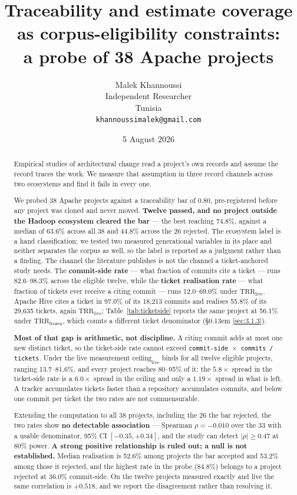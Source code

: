 \documentclass[11pt,a4paper]{article}
\title{\bfseries Traceability and estimate coverage as corpus-eligibility
constraints:\\[2pt] a probe of 38 Apache projects}
\author{Malek Khannoussi\\[2pt]
\normalsize Independent Researcher\\
\normalsize Tunisia\\
\normalsize\texttt{khannoussimalek@gmail.com}}
\date{5 August 2026}
\begin{document}
\maketitle
\thispagestyle{empty}


\begin{abstract}

Empirical studies of architectural change read a project's own records and assume the record traces the work. We measure that assumption in three record channels across two ecosystems and find it fails in every one.

We probed 38 Apache projects against a traceability bar of 0.80, pre-registered before any project was cloned and never moved. \textbf{Twelve passed, and no project outside the Hadoop ecosystem cleared the bar} --- the best reaching 74.8\%, against a median of 63.6\% across all 38 and 44.8\% across the 26 rejected. The ecosystem label is a hand classification; we tested two measured generational variables in its place and neither separates the corpus as well, so the label is reported as a judgment rather than a finding. The channel the literature publishes is not the channel a ticket-anchored study needs. The \textbf{commit-side rate} --- what fraction of commits cite a ticket --- runs 82.6--98.3\% across the eligible twelve, while the \textbf{ticket realisation rate} --- what fraction of tickets ever receive a citing commit --- runs 12.0--69.0\% under $\mathrm{TRR}_\mathrm{live}$. Apache Hive cites a ticket in 97.0\% of its 18,213 commits and realises 55.8\% of its 29,635 tickets, again $\mathrm{TRR}_\mathrm{live}$; Table~\ref{tab:ticketside} reports the same project at 56.1\% under $\mathrm{TRR}_\mathrm{frozen}$, which counts a different ticket denominator (\S\kern0.13em \ref{sec:3.1.3}).

\textbf{Most of that gap is arithmetic, not discipline.} A citing commit adds at most one new distinct ticket, so the ticket-side rate cannot exceed \texttt{commit-\allowbreak{}side $\times$ commits /\allowbreak{} tickets}. Under the live measurement $\mathrm{ceiling}_\mathrm{live}$ binds for all twelve eligible projects, ranging 13.7--81.6\%, and every project reaches 80--95\% of it: the $5.8\times$ spread in the ticket-side rate is a $6.0\times$ spread in the ceiling and only a $1.19\times$ spread in what is left. A tracker accumulates tickets faster than a repository accumulates commits, and below one commit per ticket the two rates are not commensurable.

Extending the computation to all 38 projects, including the 26 the bar rejected, the two rates show \textbf{no detectable association} --- Spearman $\rho = -0.010$ over the 33 with a usable denominator, 95\% CI $[-0.35, +0.34]$, and the study can detect $\lvert \rho \rvert \geq 0.47$ at 80\% power. \textbf{A strong positive relationship is ruled out; a null is not established.} Median realisation is 52.6\% among projects the bar accepted and 53.2\% among those it rejected, and the highest rate in the probe (84.8\%) belongs to a project rejected at 36.0\% commit-side. On the twelve projects measured exactly and live the same correlation is \textbf{$+0.518$}, and we report the disagreement rather than resolving it.


\end{abstract}
\end{document}
